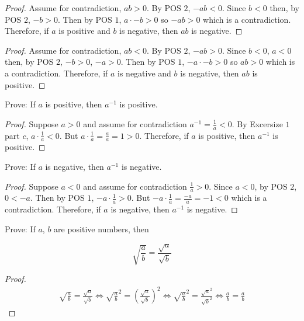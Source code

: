 \documentclass[6pt]{article}
\begin{document}
\begin{proof}
    Assume for contradiction, $ab > 0$. By POS $2$, $-ab < 0$. Since $b < 0$ then, by POS $2$, $-b > 0$.
    Then by POS $1$, $a \cdot -b > 0$ so $-ab > 0$
    which is a contradiction. Therefore, if $a$ is positive and $b$ is negative, then $ab$ is negative.
\end{proof}

\begin{proof}
    Assume for contradiction, $ab < 0$. By POS $2$, $-ab > 0$. Since $b < 0$, $a < 0$ then, by POS $2$, $-b > 0$, $-a > 0$.
    Then by POS $1$, $-a \cdot -b > 0$ so $ab > 0$
    which is a contradiction. Therefore, if $a$ is negative and $b$ is negative, then $ab$ is positive.
\end{proof}

\begin{tcolorbox}[title=Problem 2, breakable]
    Prove: If $a$ is positive, then $a^{-1}$ is positive.
\end{tcolorbox}

\begin{proof}
    Suppose $a > 0$ and assume for contradiction $a^{-1} = \frac{1}{a} < 0$.  
    By Excersize $1$ part $c$, $a \cdot \frac{1}{a} < 0$.
    But $a \cdot \frac{1}{a} = \frac{a}{a} = 1 > 0$.
    Therefore, if $a$ is positive, then $a^{-1}$ is positive.
\end{proof}

\begin{tcolorbox}[title=Problem 3, breakable]
    Prove: If $a$ is negative, then $a^{-1}$ is negative.
\end{tcolorbox}

\begin{proof}
    Suppose $a < 0$ and assume for contradiction $\frac{1}{a} > 0$.  
    Since $a < 0$, by POS $2$, $0 < -a$. 
    Then by POS $1$, $-a \cdot \frac{1}{a} > 0$.
    But $-a \cdot \frac{1}{a} = \frac{-a}{a} = -1 < 0$ which is a contradiction.
    Therefore, if $a$ is negative, then $a^{-1}$ is negative.
\end{proof}

\begin{tcolorbox}[title=Problem 4, breakable]
    Prove: If $a$, $b$ are positive numbers, then 

    \[\sqrt{\frac{a}{b}} = \frac{\sqrt{a}}{\sqrt{b}}\]
\end{tcolorbox}

\begin{proof}
    \begin{align*}
        \sqrt{\frac{a}{b}} = \frac{\sqrt{a}}{\sqrt{b}} 
        \iff {\sqrt{\frac{a}{b}}}^2 = \left(\frac{\sqrt{a}}{\sqrt{b}}\right)^2
        \iff {\sqrt{\frac{a}{b}}}^2 = {\frac{\sqrt{a}^2}{\sqrt{b}^2}}
        \iff {\frac{a}{b} = \frac{a}{b}}
    \end{align*}
\end{proof}
\end{document}
